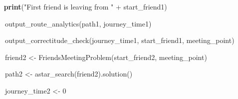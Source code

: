 \documentclass[12pt]{article}
\begin{document}
\begin{adjustwidth}{0.5in}{0.0in}
\begin{justify}
{\fontsize{8pt}{9.6pt}\selectfont \ \  \textbf{ print}("First friend is leaving from " + start\_friend1)\par}
\end{justify}\par

\end{adjustwidth}

\begin{adjustwidth}{0.5in}{0.0in}
\begin{justify}
{\fontsize{8pt}{9.6pt}\selectfont \ \ \  output\_route\_analytics(path1, journey\_time1)\par}
\end{justify}\par

\end{adjustwidth}

\begin{adjustwidth}{0.5in}{0.0in}
\begin{justify}
{\fontsize{8pt}{9.6pt}\selectfont \ \ \  output\_correctitude\_check(journey\_time1, start\_friend1, meeting\_point)\par}
\end{justify}\par

\end{adjustwidth}

\begin{adjustwidth}{0.5in}{0.0in}
\begin{justify}
{\fontsize{8pt}{9.6pt}\selectfont \ \ \  friend2 <- FriendsMeetingProblem(start\_friend2, meeting\_point)\par}
\end{justify}\par

\end{adjustwidth}

\begin{adjustwidth}{0.5in}{0.0in}
\begin{justify}
{\fontsize{8pt}{9.6pt}\selectfont \ \ \  path2 <- astar\_search(friend2).solution()\par}
\end{justify}\par

\end{adjustwidth}

\begin{adjustwidth}{0.5in}{0.0in}
\begin{justify}
{\fontsize{8pt}{9.6pt}\selectfont \ \ \  journey\_time2 <- 0\par}
\end{justify}\par

\end{adjustwidth}
\end{document}
